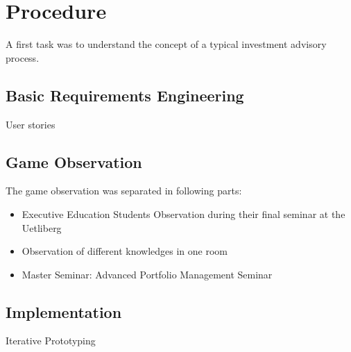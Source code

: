 \section{Procedure}
A first task was to understand the concept of a typical investment advisory process.

\subsection{Basic Requirements Engineering}
User stories

\subsection{Game Observation}
The game observation was separated in following parts:
\begin{itemize}
  \item Executive Education Students Observation during their final seminar at the Uetliberg
  \item Observation of different knowledges in one room
  \item Master Seminar: Advanced Portfolio Management Seminar
\end{itemize}

\subsection{Implementation}
Iterative Prototyping
